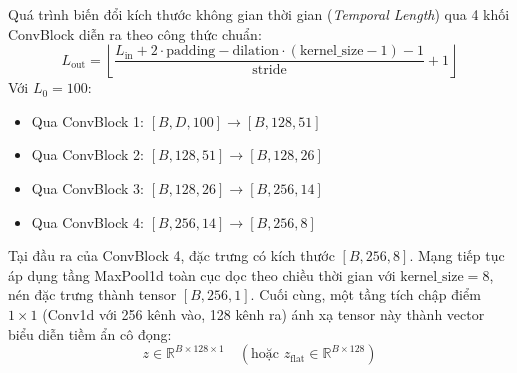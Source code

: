\documentclass[11pt,journal,onecolumn]{IEEEtran}
\begin{document}
Quá trình biến đổi kích thước không gian thời gian (\textit{Temporal Length}) qua 4 khối ConvBlock diễn ra theo công thức chuẩn:
\begin{equation}
\label{eq:conv_out_len}
L_{\text{out}} = \left\lfloor \frac{L_{\text{in}} + 2 \cdot \text{padding} - \text{dilation} \cdot (\text{kernel\_size} - 1) - 1}{\text{stride}} + 1 \right\rfloor
\end{equation}
Với $L_0 = 100$:
\begin{itemize}
    \item Qua ConvBlock 1: $[B, D, 100] \rightarrow [B, 128, 51]$
    \item Qua ConvBlock 2: $[B, 128, 51] \rightarrow [B, 128, 26]$
    \item Qua ConvBlock 3: $[B, 128, 26] \rightarrow [B, 256, 14]$
    \item Qua ConvBlock 4: $[B, 256, 14] \rightarrow [B, 256, 8]$
\end{itemize}
Tại đầu ra của ConvBlock 4, đặc trưng có kích thước $[B, 256, 8]$. Mạng tiếp tục áp dụng tầng MaxPool1d toàn cục dọc theo chiều thời gian với $\text{kernel\_size} = 8$, nén đặc trưng thành tensor $[B, 256, 1]$. Cuối cùng, một tầng tích chập điểm $1 \times 1$ (Conv1d với 256 kênh vào, 128 kênh ra) ánh xạ tensor này thành vector biểu diễn tiềm ẩn cô đọng:
\begin{equation}
z \in \mathbb{R}^{B \times 128 \times 1} \quad (\text{hoặc } z_{\text{flat}} \in \mathbb{R}^{B \times 128})
\end{equation}
\end{document}
